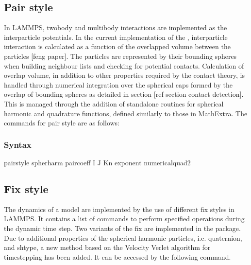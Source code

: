 \documentclass[letterpaper,10pt,english]{sphinxmanual}
\begin{document}
\subsection{Pair style}
\label{\detokenize{Sections/3_implementation:pair-style}}
\sphinxAtStartPar
In LAMMPS, two\sphinxhyphen{}body and multi\sphinxhyphen{}body interactions are implemented as the inter\sphinxhyphen{}particle potentials. In the current implementation of the , inter\sphinxhyphen{}particle interaction is calculated as a function of the overlapped volume between the particles {[}feng paper{]}.
The particles are represented by their bounding spheres when building neighbour lists and checking for potential contacts. Calculation of overlap volume,  in addition to other properties required by the contact theory, is handled through numerical integration over the spherical caps formed by the overlap of bounding spheres as detailed in section {[}ref section contact detection{]}. This is managed through the addition of standalone routines for spherical harmonic and quadrature functions, defined similarly to those in  MathExtra. The commands for pair style are as follows:


\subsubsection{Syntax}
\label{\detokenize{Sections/3_implementation:id1}}
\begin{sphinxVerbatim}[commandchars=\\\{\}]
pair\PYGZus{}style spherharm
pair\PYGZus{}coeff I J Kn exponent numerical\PYGZus{}quad2
\end{sphinxVerbatim}


\subsection{Fix style}
\label{\detokenize{Sections/3_implementation:fix-style}}
\sphinxAtStartPar
The dynamics of a model are implemented by the use of different fix styles in LAMMPS. It contains a list of commands to perform specified operations during the dynamic time step. Two variants of the fix are implemented in the  package. Due to additional properties of the spherical harmonic particles, i.e. quaternion, and shtype, a new method based on the Velocity Verlet algorithm for time\sphinxhyphen{}stepping has been added. It can be accessed by the following command.
\end{document}
